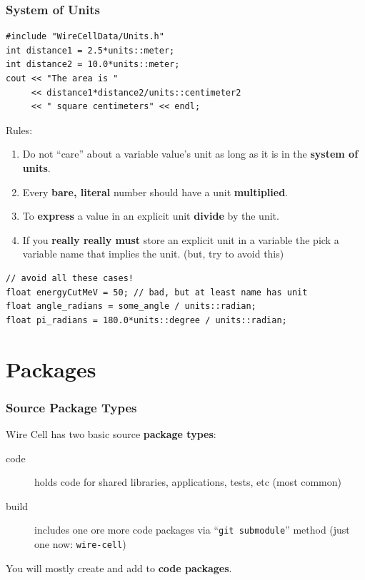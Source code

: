 \documentclass[xcolor=dvipsnames]{beamer}
\begin{document}
\begin{frame}[fragile]
  \frametitle{System of Units}

  \begin{lstlisting}
#include "WireCellData/Units.h"
int distance1 = 2.5*units::meter;
int distance2 = 10.0*units::meter;
cout << "The area is " 
     << distance1*distance2/units::centimeter2
     << " square centimeters" << endl;
  \end{lstlisting}
  Rules:
  \begin{enumerate}
  \item Do not ``care'' about a variable value's unit as long as it is
    in the \textbf{system of units}.
  \item Every \textbf{bare, literal} number should have a unit \textbf{multiplied}.
  \item To \textbf{express} a value in an explicit unit \textbf{divide} by the unit.
  \item If you \textbf{really really must} store an explicit unit in a
    variable the pick a variable name that implies the unit.
    (but, try to avoid this)
  \end{enumerate}
  \begin{lstlisting}
// avoid all these cases!
float energyCutMeV = 50; // bad, but at least name has unit
float angle_radians = some_angle / units::radian;
float pi_radians = 180.0*units::degree / units::radian;
\end{lstlisting}

\end{frame}

\section{Packages}

\begin{frame}[fragile]
\end{frame}

\begin{frame}
  \frametitle{Source Package Types}

  Wire Cell has two basic source \textbf{package types}:
  \begin{description}
  \item[code] holds code for shared libraries, applications, tests,
    etc (most common)
  \item[build] includes one ore more code packages via ``\texttt{git
      submodule}'' method (just one now: \texttt{wire-cell})
  \end{description}

  You will mostly create and add to \textbf{code packages}.
\end{frame}
\end{document}
